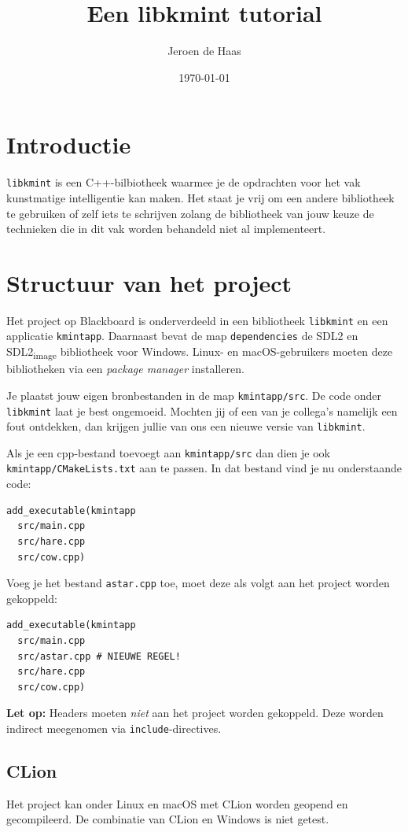 \documentclass[11pt]{article}
\author{Jeroen de Haas}
\date{\today}
\title{Een libkmint tutorial}
\begin{document}
\maketitle
\tableofcontents


\section{Introductie}
\label{sec:org677476d}
\texttt{libkmint} is een C++-bilbiotheek waarmee je de opdrachten voor het vak
kunstmatige intelligentie kan maken. Het staat je vrij om een andere
bibliotheek te gebruiken of zelf iets te schrijven zolang de bibliotheek van
jouw keuze de technieken die in dit vak worden behandeld niet al
implementeert.

\section{Structuur van het project}
\label{sec:org55d0fab}
Het project op Blackboard is onderverdeeld in een bibliotheek \texttt{libkmint} en
een applicatie \texttt{kmintapp}. Daarnaast bevat de map \texttt{dependencies} de SDL2 en
SDL2\textsubscript{image} bibliotheek voor Windows. Linux- en macOS-gebruikers moeten deze
bibliotheken via een \emph{package manager} installeren.

Je plaatst jouw eigen bronbestanden in de map \texttt{kmintapp/src}. De code onder
\texttt{libkmint} laat je best ongemoeid. Mochten jij of een van je collega's
namelijk een fout ontdekken, dan krijgen jullie van ons een nieuwe versie
van \texttt{libkmint}. 

Als je een cpp-bestand toevoegt aan \texttt{kmintapp/src} dan dien je ook
\texttt{kmintapp/CMakeLists.txt} aan te passen. In dat bestand vind je nu
onderstaande code:
\begin{verbatim}
add_executable(kmintapp
  src/main.cpp
  src/hare.cpp
  src/cow.cpp)
\end{verbatim}
Voeg je het bestand \texttt{astar.cpp} toe, moet deze als volgt aan het project
worden gekoppeld:
\begin{verbatim}
add_executable(kmintapp
  src/main.cpp
  src/astar.cpp # NIEUWE REGEL!
  src/hare.cpp
  src/cow.cpp)
\end{verbatim}

\textbf{Let op:} Headers moeten \emph{niet} aan het project worden gekoppeld. Deze
worden indirect meegenomen via \texttt{include}-directives.

\subsection{CLion}
\label{sec:org7d75c18}
Het project kan onder Linux en macOS met CLion worden geopend en
gecompileerd. De combinatie van CLion en Windows is niet getest.
\end{document}

